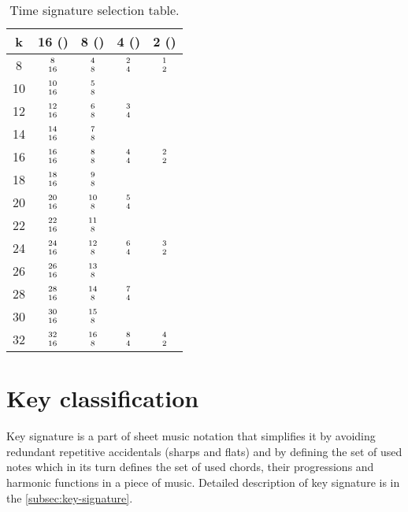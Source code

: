 \begin{table}[]
	\begin{center}
		\def\arraystretch{1.3}
		\begin{tabular}{|c||c|c|c|c|}
			\hline
			k & 16 (\Sech)   & 8 (\Acht)   & 4 (\Vier)   & 2 (\Halb)  \\ \hline
			8 & $8\atop16$   & $4\atop8$    & \cellcolor[HTML]{9AFF99}$2\atop4$   & $1\atop2$  \\ \hline
			10 & $10\atop16$  & \cellcolor[HTML]{9AFF99}$5\atop8$    & &            \\ \hline
			12 & $12\atop16$  & $6\atop8$    & \cellcolor[HTML]{9AFF99}$3\atop4$   &            \\ \hline
			14 & $14\atop16$  & \cellcolor[HTML]{9AFF99}$7\atop8$    & &            \\ \hline
			16 & $16\atop16$  & $8\atop8$    & \cellcolor[HTML]{9AFF99}$4\atop4$   & $2\atop2$  \\ \hline
			18 & $18\atop16$  & \cellcolor[HTML]{9AFF99}$9\atop8$    & &            \\ \hline
			20 & $20\atop16$  & $10\atop8$   & \cellcolor[HTML]{9AFF99}$5\atop4$   &            \\ \hline
			22 & $22\atop16$  & \cellcolor[HTML]{9AFF99}$11\atop8$   & &            \\ \hline
			24 & $24\atop16$  & $12\atop8$   & \cellcolor[HTML]{9AFF99}$6\atop4$   & $3\atop2$  \\ \hline
			26 & $26\atop16$  & \cellcolor[HTML]{9AFF99}$13\atop8$   & &            \\ \hline
			28 & $28\atop16$  & $14\atop8$   & \cellcolor[HTML]{9AFF99}$7\atop4$   &            \\ \hline
			30 & $30\atop16$  & \cellcolor[HTML]{9AFF99}$15\atop8$   & &            \\ \hline
			32 & $32\atop16$  & $16\atop8$   & $8\atop4$   & \cellcolor[HTML]{9AFF99}$4\atop2$  \\ \hline
		\end{tabular}
		\caption{Time signature selection table.}
		\label{fig:time-signatures-table}
	\end{center}
\end{table}


\section{Key classification}\label{sec:key-classification}
Key signature is a part of sheet music notation that simplifies it by avoiding redundant repetitive accidentals (sharps
and flats) and by defining the set of used notes which in its turn defines the set of used chords, their progressions
and harmonic functions in a piece of music. Detailed description of key signature is in the \cref{subsec:key-signature}.

